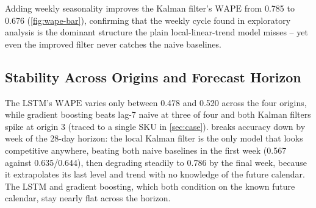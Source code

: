 \documentclass[conference]{IEEEtran}
\newcommand{\WAPE}{\mathrm{WAPE}}
\begin{document}
Adding weekly seasonality improves the Kalman filter's $\WAPE$ from 0.785 to 0.676
(\cref{fig:wape-bar}), confirming that the weekly cycle found in exploratory analysis is the
dominant structure the plain local-linear-trend model misses -- yet even the improved filter never
catches the naive baselines.

\subsection{Stability Across Origins and Forecast Horizon}
The LSTM's $\WAPE$ varies only between 0.478 and 0.520 across the four origins, while gradient
boosting beats lag-7 naive at three of four and both Kalman filters spike at origin 3 (traced to a
single SKU in \cref{sec:case}).  breaks accuracy down by week of the 28-day
horizon: the local Kalman filter is the only model that looks competitive anywhere, beating both
naive baselines in the first week (0.567 against 0.635/0.644), then degrading steadily to 0.786 by
the final week, because it extrapolates its last level and trend with no knowledge of the future
calendar. The LSTM and gradient boosting, which both condition on the known future calendar, stay
nearly flat across the horizon.
\end{document}
